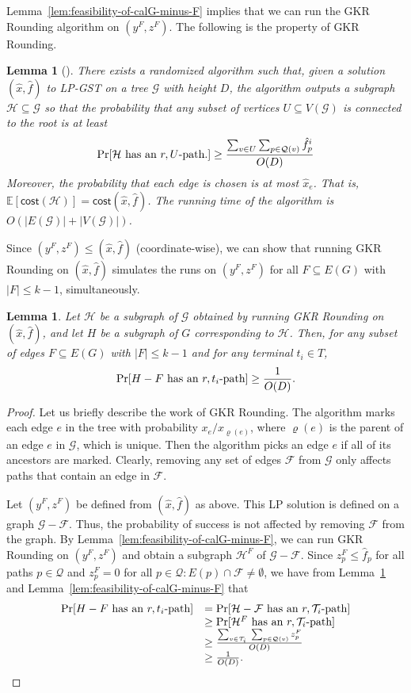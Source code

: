 \documentclass[11pt]{article}
\newtheorem{lemma}[theorem]{Lemma}
\theoremstyle{definition}
\theoremstyle{remark}
\renewcommand{\Pr}{\mathrm{\sc Pr}}
\newcommand{\E}{\mathbb{E}}
\newcommand{\calG}{\mathcal{G}}
\newcommand{\calF}{\mathcal{F}}
\newcommand{\calT}{\mathcal{T}}
\newcommand{\calH}{\mathcal{H}}
\newcommand{\calQ}{\mathcal{Q}}
\newcommand{\cost}{\mathsf{cost}}
\renewcommand{\setminus}{-}
\begin{document}
Lemma~\ref{lem:feasibility-of-calG-minus-F} implies that
we can run the GKR Rounding algorithm on $(y^F,z^F)$.
The following is the property of GKR Rounding.

\begin{lemma}[\cite{GargKR00}]
\label{lem:prop-of-GKR}
There exists a randomized algorithm such that,
given a solution $(\hat{x},\hat{f})$ to LP-GST on a tree $\calG$
with height $D$,
the algorithm outputs a subgraph $\calH\subseteq\calG$
so that the probability that any subset of vertices 
$U\subseteq V(\calG)$ is connected to the root is at least
\[
\Pr[\mbox{$\calH$ has an $r,U$-path.}] 
\geq \frac{\sum_{v\in U}\sum_{p\in\calQ(v)}\hat{f}^i_p}{O(D)}
\]
Moreover, the probability that each edge is chosen is at most $\hat{x}_e$.
That is, $\E[\cost(\calH)] = \cost(\hat{x},\hat{f})$.
The running time of the algorithm is $O(|E(\calG)| + |V(\calG)|)$. 
\end{lemma}
 
Since $(y^F,z^F) \leq (\hat{x},\hat{f})$ (coordinate-wise),
we can show that running GKR Rounding 
on $(\hat{x},\hat{f})$ simulates 
the runs on $(y^F,z^F)$ for all $F\subseteq E(G)$
with $|F|\leq k-1$, simultaneously.

\begin{lemma}
\label{lem:backward-feasible-kDST}
Let $\calH$ be a subgraph of $\calG$ obtained by
running GKR Rounding on $(\hat{x},\hat{f})$,
and let $H$ be a subgraph of $G$ corresponding to $\calH$.
Then, for any subset of edges $F\subseteq E(G)$ with $|F|\leq k-1$
and for any terminal $t_i\in T$, 
\[
\Pr[\mbox{$H\setminus F$ has an $r,t_i$-path}] \geq \frac{1}{O(D)}.
\]
\end{lemma}
\begin{proof}
Let us briefly describe the work of GKR Rounding.
The algorithm marks each edge $e$ in the tree with
probability $x_e/x_{\varrho(e)}$, where $\varrho(e)$ is the parent of
an edge $e$ in $\calG$, which is unique.
Then the algorithm picks an edge $e$ if all of its ancestors
are marked. 
Clearly, removing any set of edges $\calF$ from $\calG$
only affects paths that contain an edge in $\calF$.

Let $(y^F,z^F)$ be defined from $(\hat{x},\hat{f})$ as above.
This LP solution is defined on a graph $\calG\setminus\calF$.
Thus, the probability of success is not affected by removing $\calF$
from the graph. 
By Lemma~\ref{lem:feasibility-of-calG-minus-F},
we can run GKR Rounding on $(y^F,z^F)$ and obtain
a subgraph $\calH^F$ of $\calG \setminus \calF$.
Since $z^F_p \leq \hat{f}_p$ for all paths $p\in\calQ$
and $z^F_p=0$ for all $p\in \calQ:E(p)\cap \calF\neq\emptyset$,
we have from Lemma~\ref{lem:prop-of-GKR}
and Lemma~\ref{lem:feasibility-of-calG-minus-F} that
\[
\begin{array}{rl}
\Pr[\mbox{$H\setminus F$ has an $r,t_i$-path}] 
&= 
  \Pr[\mbox{$\calH\setminus\calF$ has an $r,\calT_i$-path}]\\
&\geq 
  \Pr[\mbox{$\calH^F$ has an $r,\calT_i$-path}]\\
&\geq 
  \frac{\sum_{v\in\calT_i}\;\sum_{p\in\calQ(v)}z^F_p}{O(D)}\\
&\geq 
  \frac{1}{O(D)}.
\end{array}
\]
\end{proof}
\end{document}
